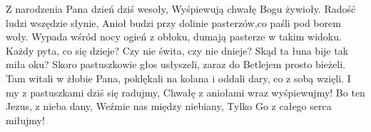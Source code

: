 \beginverse
Z narodzenia Pana dzień dziś wesoły,
Wyśpiewują chwałę Bogu żywioły.
Radość ludzi wszędzie słynie,
Anioł budzi przy dolinie
pasterzów,co paśli pod borem woły.
\endverse
\beginverse
Wypada wśród nocy ogień z obłoku,
dumają pasterze w takim widoku.
Każdy pyta, co się dzieje?
Czy nie świta, czy nie dnieje?
Skąd ta łuna bije tak miła oku?
\endverse
\beginverse
Skoro pastuszkowie głos usłyszeli,
zaraz do Betlejem prosto bieżeli.
Tam witali w żłobie Pana,
poklękali na kolana
i oddali dary, co z sobą wzięli.
\endverse
\beginverse
I my z pastuszkami dziś się radujmy,
Chwałę z aniołami wraz wyśpiewujmy!
Bo ten Jezus, z nieba dany,
Weźmie nas między niebiany,
Tylko Go z całego serca miłujmy! 
\endverse
\endsong